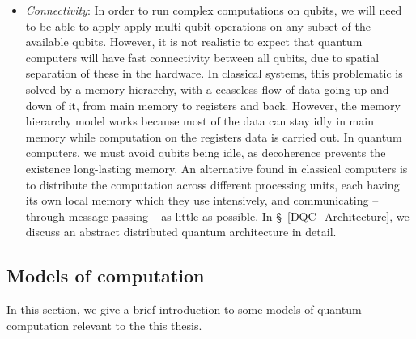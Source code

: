 \begin{itemize}
  \item \textit{Connectivity}: In order to run complex computations on qubits, we will need to be able to apply apply multi-qubit operations on any subset of the available qubits. However, it is not realistic to expect that quantum computers will have fast connectivity between all qubits, due to spatial separation of these in the hardware. In classical systems, this problematic is solved by a memory hierarchy, with a ceaseless flow of data going up and down of it, from main memory to registers and back. However, the memory hierarchy model works because most of the data can stay idly in main memory while computation on the registers data is carried out. In quantum computers, we must avoid qubits being idle, as decoherence prevents the existence long-lasting memory. An alternative found in classical computers is to distribute the computation across different processing units, each having its own local memory which they use intensively, and communicating -- through message passing -- as little as possible. In \S~\ref{DQC_Architecture}, we discuss an abstract distributed quantum architecture in detail.

\end{itemize}


\subsection{Models of computation}
\label{Models}

In this section, we give a brief introduction to some models of quantum computation relevant to the this thesis.


